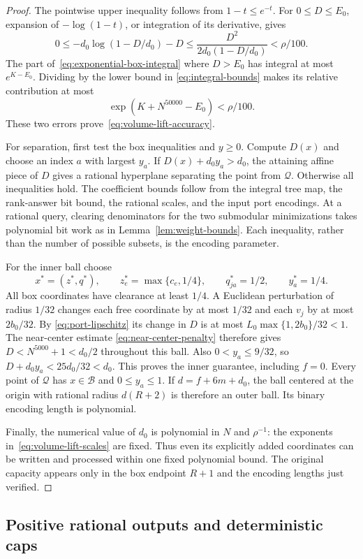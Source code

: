 \begin{proof}
The pointwise upper inequality follows from $1-t\le e^{-t}$. For
$0\le D\le E_0$, expansion of $-\log(1-t)$, or integration of its
derivative, gives
\[
 0\le-d_0\log(1-D/d_0)-D
 \le\frac{D^2}{2d_0(1-D/d_0)}<\rho/100.
\]
The part of~\eqref{eq:exponential-box-integral} where $D>E_0$ has
integral at most $e^{K-E_0}$. Dividing by the lower bound in
\eqref{eq:integral-bounds} makes its relative contribution at most
\[
 \exp(K+N^{50000}-E_0)<\rho/100.
\]
These two errors prove~\eqref{eq:volume-lift-accuracy}.

For separation, first test the box inequalities and $y\ge0$. Compute
$D(x)$ and choose an index $a$ with largest $y_a$. If
$D(x)+d_0y_a>d_0$, the attaining affine piece of $D$ gives a rational
hyperplane separating the point from $\mathcal Q$. Otherwise all
inequalities hold. The coefficient bounds follow from the integral
tree map, the rank-answer bit bound, the rational scales, and the
input port encodings. At a rational query, clearing denominators for
the two submodular minimizations takes polynomial bit work as in
Lemma~\ref{lem:weight-bounds}. Each inequality, rather than the number
of possible subsets, is the encoding parameter.

For the inner ball choose
\[
 x^*=(z^*,q^*),\qquad z^*_e=\max\{c_e,1/4\},\qquad
 q^*_{ja}=1/2,\qquad y^*_a=1/4.
\]
All box coordinates have clearance at least $1/4$. A Euclidean
perturbation of radius $1/32$ changes each free coordinate by at most
$1/32$ and each $v_j$ by at most $2b_0/32$. By
\eqref{eq:port-lipschitz} its change in $D$ is at most
$L_0\max\{1,2b_0\}/32<1$. The near-center estimate
\eqref{eq:near-center-penalty} therefore gives $D<N^{5000}+1<d_0/2$
throughout this ball. Also $0<y_a\le9/32$, so
$D+d_0y_a<25d_0/32<d_0$. This proves the inner guarantee, including
$f=0$. Every point of $\mathcal Q$ has $x\in\mathcal B$ and
$0\le y_a\le1$. If $d=f+6m+d_0$, the ball centered at the origin
with rational radius $d(R+2)$ is therefore an outer ball. Its binary
encoding length is polynomial.

Finally, the numerical value of $d_0$ is polynomial in $N$ and
$\rho^{-1}$: the exponents in~\eqref{eq:volume-lift-scales} are fixed.
Thus even its explicitly added coordinates can be written and
processed within one fixed polynomial bound. The original capacity
appears only in the box endpoint $R+1$ and the encoding lengths just
verified.
\end{proof}

\subsection{Positive rational outputs and deterministic caps}

